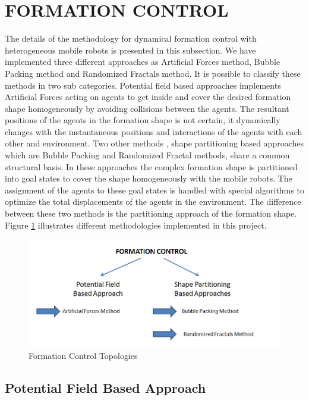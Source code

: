 \section{FORMATION CONTROL} \label{formation_control_ref}
The details of the methodology for dynamical formation control with heterogeneous mobile robots is presented in this subsection. We have implemented three different approaches as Artificial Forces method, Bubble Packing method and Randomized Fractals method. It is possible to classify these methods in two sub categories. Potential field based approaches implements Artificial Forces acting on agents to get inside and cover the desired formation shape homogeneously by avoiding collisions between the agents. The resultant positions of the agents in the formation shape is not certain, it dynamically changes with the instantaneous positions and interactions of the agents with each other and environment. Two other methods , shape partitioning based approaches which are Bubble Packing and Randomized Fractal methods, share a common structural basis. In these approaches the complex formation shape is partitioned into goal states to cover the shape homogeneously with the mobile robots. The assignment of the agents to these goal states is handled with special algorithms to optimize the total displacements of the agents in the environment. The difference between these two methods is the partitioning approach of the formation shape. Figure \ref{formation_controlin_figi} illustrates different methodologies implemented in this project.
		
\begin{figure}[H]
\caption{Formation Control Topologies} \label{formation_controlin_figi}
\centering
\includegraphics[scale = 0.60]{methods}
\end{figure}		
		
\subsection{Potential Field Based Approach}

